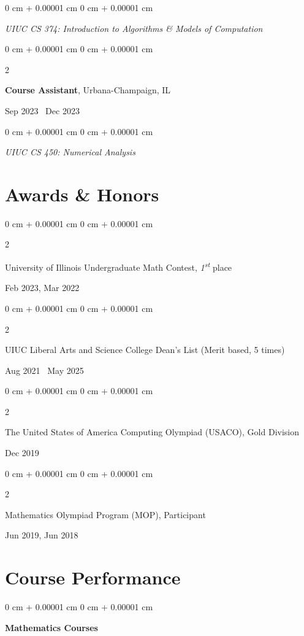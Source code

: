 \documentclass[11pt, letterpaper]{article}
\newenvironment{onecolentry}{
    \begin{adjustwidth}{
        0 cm + 0.00001 cm
    }{
        0 cm + 0.00001 cm
    }
}{
    \end{adjustwidth}
} %
\newenvironment{twocolentry}[2][]{
    \onecolentry
    \def\secondColumn{#2}
    \setcolumnwidth{\fill, 4.5 cm}
    \begin{paracol}{2}
}{
    \switchcolumn \raggedleft \secondColumn
    \end{paracol}
    \endonecolentry
} %
\begin{document}
    \vspace{0.10 cm}
    \begin{onecolentry}
        \textit{UIUC CS 374: Introduction to Algorithms \& Models of Computation}
    \end{onecolentry}

    \vspace{0.20 cm}

    \begin{twocolentry}{Sep 2023 \textendash\ Dec 2023}
        \textbf{Course Assistant}, Urbana-Champaign, IL
    \end{twocolentry}

    \vspace{0.10 cm}
    \begin{onecolentry}
        \textit{UIUC CS 450: Numerical Analysis}
    \end{onecolentry}


\section{Awards \& Honors}
    \begin{twocolentry}{Feb 2023, Mar 2022}
        University of Illinois Undergraduate Math Contest, \textit{1\textsuperscript{st}} place
    \end{twocolentry}

    \vspace{0.10 cm}
    \begin{twocolentry}{Aug 2021 \textendash\ May 2025}
        UIUC Liberal Arts and Science College Dean's List (Merit based, 5 times)
    \end{twocolentry}

    \vspace{0.20 cm}
    \begin{twocolentry}{Dec 2019}
        The United States of America Computing Olympiad (USACO), Gold Division
    \end{twocolentry}

    \vspace{0.20 cm}
    \begin{twocolentry}{Jun 2019, Jun 2018}
        Mathematics Olympiad Program (MOP), Participant
    \end{twocolentry}


\section{Course Performance}
    \begin{onecolentry}
        \textbf{Mathematics Courses}
    \end{onecolentry}
\end{document}

